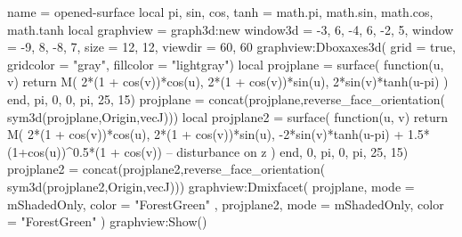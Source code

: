 \documentclass{standalone}
\begin{document}
\begin{luadraw}{name = opened-surface}
local pi, sin, cos, tanh = math.pi, math.sin, math.cos, math.tanh
local graphview = graph3d:new{
  window3d = {-3, 6, -4, 6, -2, 5},
  window   = {-9, 8, -8, 7},
  size     = {12, 12},
  viewdir  = {60, 60}
}
graphview:Dboxaxes3d({
  grid      = true,
  gridcolor = "gray",
  fillcolor = "lightgray"})
local projplane = surface(
  function(u, v)
    return M(
      2*(1 + cos(v))*cos(u),
      2*(1 + cos(v))*sin(u),
      2*sin(v)*tanh(u-pi)
    )
  end,
  pi, 0, 0, pi,
  {25, 15})
projplane = concat(projplane,reverse_face_orientation( sym3d(projplane,{Origin,vecJ})))
local projplane2 = surface(
  function(u, v)
    return M(
      2*(1 + cos(v))*cos(u),
      2*(1 + cos(v))*sin(u),
      -2*sin(v)*tanh(u-pi) + 1.5*(1+cos(u))^0.5*(1 + cos(v)) -- disturbance on z
    )
  end,
  0, pi, 0, pi,
  {25, 15})
projplane2 = concat(projplane2,reverse_face_orientation( sym3d(projplane2,{Origin,vecJ})))
graphview:Dmixfacet(
  projplane,
  {
    mode  = mShadedOnly,
    color = "ForestGreen"
  },
  projplane2,
  {
    mode  = mShadedOnly,
    color = "ForestGreen"
  }  
  )
graphview:Show()
\end{luadraw}
\end{document}
